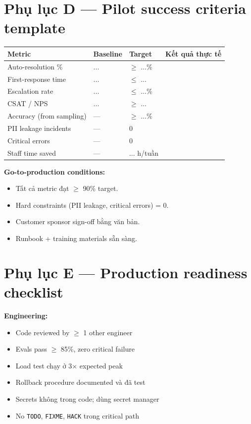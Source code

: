 \documentclass[11pt,a4paper]{article}
\begin{document}
\section*{Phụ lục D — Pilot success criteria template}

\begin{tabularx}{\linewidth}{@{}p{3.5cm} X X X@{}}
\toprule
\textbf{Metric} & \textbf{Baseline} & \textbf{Target} & \textbf{Kết quả thực tế} \\
\midrule
Auto-resolution \% & ... & $\geq$ ...\% & \\
First-response time & ... & $\leq$ ... & \\
Escalation rate & ... & $\leq$ ...\% & \\
CSAT / NPS & ... & $\geq$ ... & \\
Accuracy (from sampling) & --- & $\geq$ ...\% & \\
PII leakage incidents & --- & 0 & \\
Critical errors & --- & 0 & \\
Staff time saved & --- & ... h/tuần & \\
\bottomrule
\end{tabularx}

\textbf{Go-to-production conditions:}
\begin{itemize}
\item Tất cả metric đạt $\geq$ 90\% target.
\item Hard constraints (PII leakage, critical errors) = 0.
\item Customer sponsor sign-off bằng văn bản.
\item Runbook + training materials sẵn sàng.
\end{itemize}

\section*{Phụ lục E — Production readiness checklist}

\textbf{Engineering:}
\begin{itemize}
\item[$\square$] Code reviewed by $\geq$ 1 other engineer
\item[$\square$] Evals pass $\geq$ 85\%, zero critical failure
\item[$\square$] Load test chạy ở 3$\times$ expected peak
\item[$\square$] Rollback procedure documented và đã test
\item[$\square$] Secrets không trong code; dùng secret manager
\item[$\square$] No \texttt{TODO}, \texttt{FIXME}, \texttt{HACK} trong critical path
\end{itemize}
\end{document}
